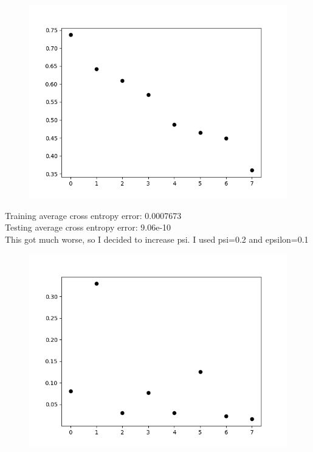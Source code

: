 \documentclass{article}
\begin{document}
\begin{figure}[h!]
  \includegraphics[width=\linewidth]{psi_0.01_epsilon_0.1.png}
\end{figure}

Training average cross entropy error: 0.0007673 \\
Testing average cross entropy error: 9.06e-10 \\

This got much worse, so I decided to increase psi.
I used psi=0.2 and epsilon=0.1

\newpage

\begin{figure}[h!]
  \includegraphics[width=\linewidth]{psi_0.2_epsilon_0.1.png}
\end{figure}
\end{document}
